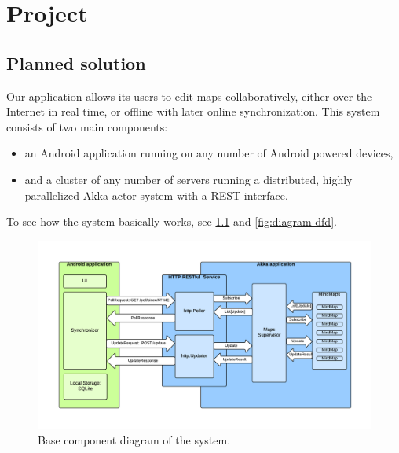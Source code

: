 %
%
%
%
%

\chapter{Project}
\label{chap:project}



\section{Planned solution}
\label{sec:plan}

Our application allows its users to edit maps collaboratively, either over the Internet in real time, or offline with later online synchronization. This system consists of two main components:

\begin{itemize}
	\item an Android application running on any number of Android powered devices,
	\item and a cluster of any number of servers running a distributed, highly parallelized Akka actor system with a REST interface.
\end{itemize}

To see how the system basically works, see \cref{fig:diagram-components-system} and \cref{fig:diagram-dfd}.

\begin{figure}[h]
	\centering
	\includegraphics[width=\textwidth]{component-diagram}
	\caption{Base component diagram of the system.}
	\label{fig:diagram-components-system}
\end{figure}

